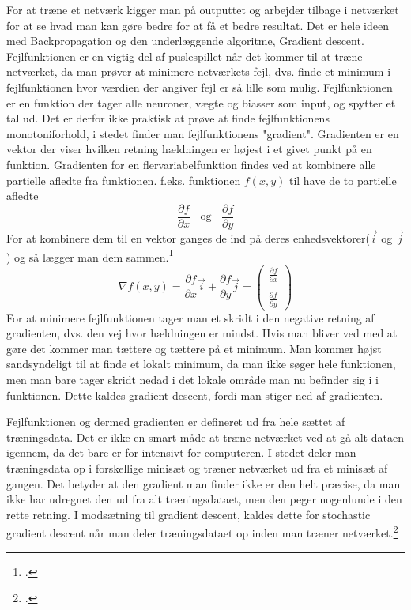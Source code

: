 For at træne et netværk kigger man på outputtet og arbejder tilbage i netværket for at se hvad man kan gøre bedre for at få et bedre resultat. Det
er hele ideen med Backpropagation og den underlæggende algoritme, Gradient descent. Fejlfunktionen er en vigtig del af puslespillet
når det kommer til at træne netværket, da man prøver at minimere netværkets fejl, dvs. finde et minimum i fejlfunktionen hvor værdien der angiver
fejl er så lille som mulig. Fejlfunktionen er en funktion der tager alle neuroner, vægte og biasser som input, og spytter et tal ud. Det er derfor
ikke praktisk at prøve at finde fejlfunktionens monotoniforhold, i stedet finder man fejlfunktionens "gradient". Gradienten er en vektor der viser
hvilken retning hældningen er højest i et givet punkt på en funktion. Gradienten for en flervariabelfunktion findes ved at kombinere alle 
partielle afledte fra funktionen. f.eks. funktionen $f(x, y)$ til have de to partielle afledte
$$\frac{\partial f}{\partial x} ~~~~ \text{og} ~~~~ \frac{\partial f}{\partial y}$$
For at kombinere dem til en vektor ganges de ind på deres enhedsvektorer($\vec{i}$ og $\vec{j}$) og så lægger man dem sammen.\footcite{wikigradient}
$$\nabla f(x, y) = \frac{\partial f}{\partial x} \vec{i} + \frac{\partial f}{\partial y} \vec{j} = \begin{pmatrix} \frac{\partial f}{\partial x} \\ \\ \frac{\partial f}{\partial y} \end{pmatrix}$$
For at minimere fejlfunktionen tager man et skridt i den negative retning af gradienten, dvs. den vej hvor hældningen er mindst. Hvis man bliver ved med at gøre det kommer man tættere og tættere på
et minimum. Man kommer højst sandsyndeligt til at finde et lokalt minimum, da man ikke søger hele funktionen, men man bare tager skridt nedad i det lokale område man nu befinder sig i i funktionen.
Dette kaldes gradient descent, fordi man stiger ned af gradienten.

Fejlfunktionen og dermed gradienten er defineret ud fra hele sættet af træningsdata. Det er ikke en smart måde at træne netværket ved at gå alt dataen igennem, da det bare er for intensivt for
computeren. I stedet deler man træningsdata op i forskellige minisæt og træner netværket ud fra et minisæt af gangen. Det betyder at den gradient man finder ikke er den helt præcise, da man
ikke har udregnet den ud fra alt træningsdataet, men den peger nogenlunde i den rette retning. I modsætning til gradient descent, kaldes dette for stochastic gradient descent når man deler
træningsdataet op inden man træner netværket.\footcite{3b1b3}

